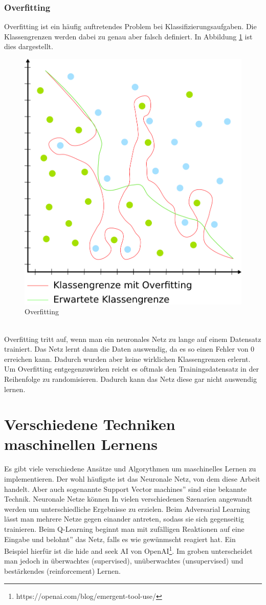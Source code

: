 \documentclass{article}
\begin{document}
\subsubsection{Overfitting}
Overfitting ist ein häufig auftretendes Problem bei Klassifizierungsaufgaben. Die Klassengrenzen werden dabei zu genau aber falsch definiert. In Abbildung \ref{Overfitting} ist dies dargestellt.
\begin{figure}[h]
	\centering
	\includegraphics[width=0.6\linewidth]{../graphics/overfitting.png}
	\caption{Overfitting}
	\label{Overfitting}
\end{figure}
\\
Overfitting tritt auf, wenn man ein neuronales Netz zu lange auf einem Datensatz trainiert. Das Netz lernt dann die Daten auswendig, da es so einen Fehler von 0 erreichen kann. Dadurch wurden aber keine wirklichen Klassengrenzen erlernt.\\
Um Overfitting entgegenzuwirken reicht es oftmals den Trainingsdatensatz in der Reihenfolge zu randomisieren. Dadurch kann das Netz diese gar nicht auswendig lernen.

\section{Verschiedene Techniken maschinellen Lernens}
Es gibt viele verschiedene Ansätze und Algorythmen um maschinelles Lernen zu implementieren. Der wohl häufigste ist das Neuronale Netz, von dem diese Arbeit handelt. Aber auch sogenannte \glqq Support Vector machines'' sind eine bekannte Technik. Neuronale Netze können In vielen verschiedenen Szenarien angewandt werden um unterschiedliche Ergebnisse zu erzielen. Beim Adversarial Learning lässt man mehrere Netze gegen einander antreten, sodass sie sich gegenseitig trainieren. Beim Q-Learning beginnt man mit zufälligen Reaktionen auf eine Eingabe und \glqq belohnt'' das Netz, falls es wie gewünmscht reagiert hat. Ein Beispiel hierfür ist die hide and seek AI von OpenAI\footnote{https://openai.com/blog/emergent-tool-use/}. Im groben unterscheidet man jedoch in überwachtes (supervised), unüberwachtes (unsupervised) und bestärkendes (reinforcement) Lernen.
\end{document}
